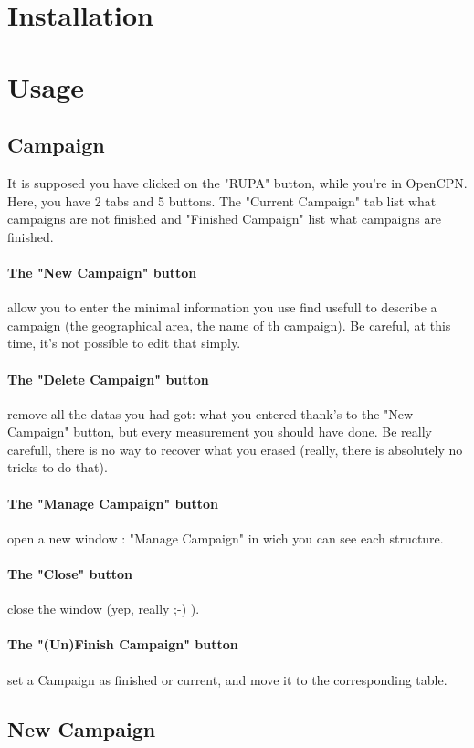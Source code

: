 \documentclass[11pt]{report}
\begin{document}
	    \section{Installation}
	    \section{Usage}
		\subsection{Campaign}
		    It is supposed you have clicked on the "RUPA" button, while you're in OpenCPN.
		    Here, you have 2 tabs and 5 buttons. The "Current Campaign" tab list what campaigns are not finished
		    and "Finished Campaign" list what campaigns are finished.
		    \paragraph{The "New Campaign" button} allow you to enter the minimal information you use find usefull to describe
		    a campaign (the geographical area, the name of th campaign). Be careful, at this time, it's not possible 
		    to edit that simply.
		    \paragraph{The "Delete Campaign" button} remove all the datas you had got: what you entered thank's to the "New 
		    Campaign" button, but every measurement you should have done. Be really carefull, there is no way to 
		    recover what you erased (really, there is absolutely no tricks to do that).
		    \paragraph{The "Manage Campaign" button} open a new window : "Manage Campaign" in wich you can see each structure.
		    \paragraph{The "Close" button} close the window (yep, really ;-) ).
		    \paragraph{The "(Un)Finish Campaign" button} set a Campaign as finished or current, and move it to the corresponding table.

		\subsection{New Campaign}
\end{document}
